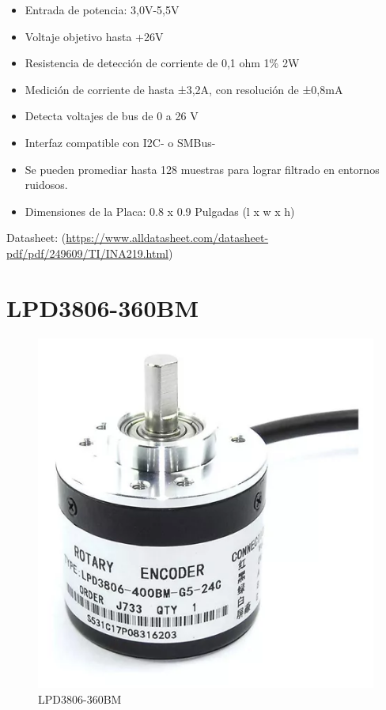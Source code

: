                 \begin{itemize}[label=•]
                    \setlength{\itemindent}{2em}
                    
                    \item Entrada de potencia: 3,0V-5,5V\par
                    \item Voltaje objetivo hasta +26V\par
                    \item Resistencia de detección de corriente de 0,1 ohm 1\% 2W\par
                    \item Medición de corriente de hasta ±3,2A, con resolución de ±0,8mA\par
                    \item Detecta voltajes de bus de 0 a 26 V\par
                    \item Interfaz compatible con I2C- o SMBus-\par
                    \item Se pueden promediar hasta 128 muestras para lograr filtrado en entornos ruidosos.\par
                    \item Dimensiones de la Placa: 0.8 x 0.9 Pulgadas (l x w x h)\par
                \end{itemize}
            
                Datasheet: (\href{https://www.alldatasheet.com/datasheet-pdf/pdf/249609/TI/INA219.html}{https://www.alldatasheet.com/datasheet-pdf/pdf/249609/TI/INA219.html})\par

        \newpage
        
        \section{LPD3806-360BM}
        \label{encoder}
        
                \begin{figure}[!ht]
                \centering
                \includegraphics[width=0.5\linewidth]{Imagenes/Anexo_C/Encoder.png}
            \caption{LPD3806-360BM}
            \label{fig:c3}
        \end{figure}
        
